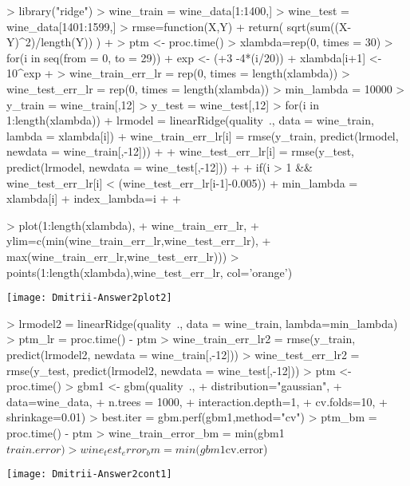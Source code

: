 \documentclass{article}
\begin{document}
\begin{Schunk}
\begin{Sinput}
> library("ridge")
> wine_train = wine_data[1:1400,]
> wine_test = wine_data[1401:1599,]
> rmse=function(X,Y){
+   return( sqrt(sum((X-Y)^2)/length(Y)) )
+ }
> ptm <- proc.time()
> xlambda=rep(0, times = 30)
> for(i in seq(from = 0, to = 29)){
+ exp <- (+3 -4*(i/20))
+ xlambda[i+1] <- 10^exp
+ }
> wine_train_err_lr = rep(0, times = length(xlambda))
> wine_test_err_lr = rep(0, times = length(xlambda))
> min_lambda = 10000
> y_train = wine_train[,12]
> y_test = wine_test[,12]
> for(i in 1:length(xlambda)){
+ lrmodel = linearRidge(quality~., data = wine_train, lambda = xlambda[i])
+ wine_train_err_lr[i] = rmse(y_train, predict(lrmodel, newdata = wine_train[,-12]))
+ 
+ wine_test_err_lr[i] = rmse(y_test, predict(lrmodel, newdata = wine_test[,-12]))
+ 
+ if(i > 1 && wine_test_err_lr[i] < (wine_test_err_lr[i-1]-0.005)){
+ min_lambda = xlambda[i]
+ index_lambda=i
+   }
+ }
\end{Sinput}
\end{Schunk}
\begin{Schunk}
\begin{Sinput}
> plot(1:length(xlambda),
+      wine_train_err_lr,
+      ylim=c(min(wine_train_err_lr,wine_test_err_lr),
+             max(wine_train_err_lr,wine_test_err_lr)))
> points(1:length(xlambda),wine_test_err_lr, col='orange')
\end{Sinput}
\end{Schunk}
\texttt{[image: Dmitrii-Answer2plot2]}
\begin{Schunk}
\begin{Sinput}
> lrmodel2 = linearRidge(quality~., data = wine_train, lambda=min_lambda)
> ptm_lr = proc.time() - ptm
> wine_train_err_lr2 = rmse(y_train, predict(lrmodel2, newdata = wine_train[,-12]))
> wine_test_err_lr2 = rmse(y_test, predict(lrmodel2, newdata = wine_test[,-12]))
> ptm <- proc.time()
> gbm1 <- gbm(quality~.,
+             distribution="gaussian", 
+             data=wine_data, 
+             n.trees = 1000,
+             interaction.depth=1, 
+             cv.folds=10, 
+             shrinkage=0.01)
> best.iter = gbm.perf(gbm1,method="cv")
> ptm_bm = proc.time() - ptm
> wine_train_error_bm =  min(gbm1$train.error)
> wine_test_error_bm =  min(gbm1$cv.error)
\end{Sinput}
\end{Schunk}
\texttt{[image: Dmitrii-Answer2cont1]}
\end{document}
